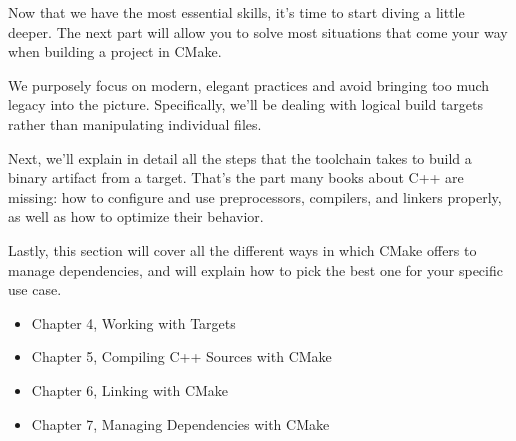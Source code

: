 Now that we have the most essential skills, it's time to start diving a little deeper. The next part will allow you to solve most situations that come your way when building a project in CMake.

We purposely focus on modern, elegant practices and avoid bringing too much legacy into the picture. Specifically, we'll be dealing with logical build targets rather than manipulating individual files.

Next, we'll explain in detail all the steps that the toolchain takes to build a binary artifact from a target. That's the part many books about C++ are missing: how to configure and use preprocessors, compilers, and linkers properly, as well as how to optimize their behavior.

Lastly, this section will cover all the different ways in which CMake offers to manage dependencies, and will explain how to pick the best one for your specific use case.

\begin{itemize}
\item Chapter 4, Working with Targets
\item Chapter 5, Compiling C++ Sources with CMake
\item Chapter 6, Linking with CMake
\item Chapter 7, Managing Dependencies with CMake
\end{itemize}